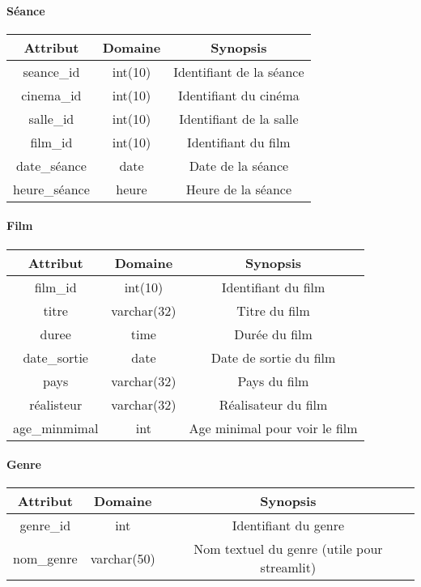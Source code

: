 \documentclass[12pt]{article}
\begin{document}
\paragraph*{Séance}
\begin{center}
    \begin{tabular}{||c c c||} 
     \hline
     Attribut & Domaine & Synopsis\\ [0.5ex] 
     \hline\hline
     {\color{blue} seance{\_}id} & int(10) & Identifiant de la séance \\ 
     \hline
     cinema{\_}id & int(10) & Identifiant du cinéma \\
     \hline
     salle{\_}id & int(10) & Identifiant de la salle\\
     \hline
     film{\_}id & int(10) & Identifiant du film \\
     \hline
     date{\_}séance & date & Date de la séance \\
     \hline
     heure{\_}séance & heure & Heure de la séance \\
     \hline
    \end{tabular}
\end{center}
\pagebreak
\paragraph*{Film}
\begin{center}
    \begin{tabular}{||c c c||} 
     \hline
     Attribut & Domaine & Synopsis\\ [0.5ex] 
     \hline\hline
     {\color{blue} film{\_}id} & int(10) & Identifiant du film \\ 
     \hline
     titre & varchar(32) & Titre du film \\
     \hline
     duree & time & Durée du film \\
     \hline
     date{\_}sortie & date & Date de sortie du film \\
     \hline
     pays & varchar(32) & Pays du film \\
     \hline
     réalisteur & varchar(32) & Réalisateur du film \\
     \hline
     age{\_}minmimal & int & Age minimal pour voir le film \\
     \hline
    \end{tabular}
\end{center}
\paragraph*{Genre}
\begin{center}
    \begin{tabular}{||c c c||} 
     \hline
     Attribut & Domaine & Synopsis\\ [0.5ex] 
     \hline\hline
     {\color{blue} genre{\_}id} & int & Identifiant du genre \\ 
     \hline
     nom{\_}genre & varchar(50) & Nom textuel du genre (utile pour streamlit) \\
     \hline
    \end{tabular}
\end{center}
\end{document}
